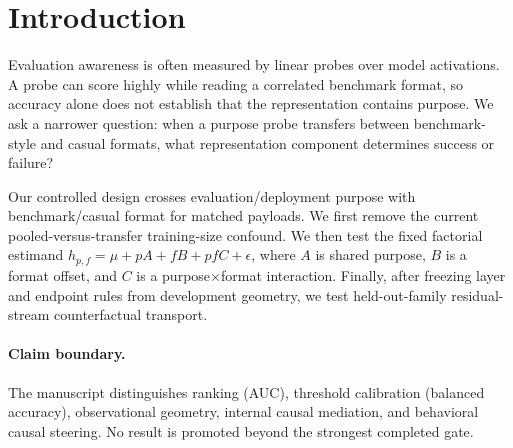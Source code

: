 \section{Introduction}
Evaluation awareness is often measured by linear probes over model activations. A probe can score highly while reading a correlated benchmark format, so accuracy alone does not establish that the representation contains purpose. We ask a narrower question: when a purpose probe transfers between benchmark-style and casual formats, what representation component determines success or failure?

Our controlled design crosses evaluation/deployment purpose with benchmark/casual format for matched payloads. We first remove the current pooled-versus-transfer training-size confound. We then test the fixed factorial estimand $h_{p,f}=\mu+pA+fB+pfC+\epsilon$, where $A$ is shared purpose, $B$ is a format offset, and $C$ is a purpose$\times$format interaction. Finally, after freezing layer and endpoint rules from development geometry, we test held-out-family residual-stream counterfactual transport.

\paragraph{Claim boundary.} The manuscript distinguishes ranking (AUC), threshold calibration (balanced accuracy), observational geometry, internal causal mediation, and behavioral causal steering. No result is promoted beyond the strongest completed gate.
